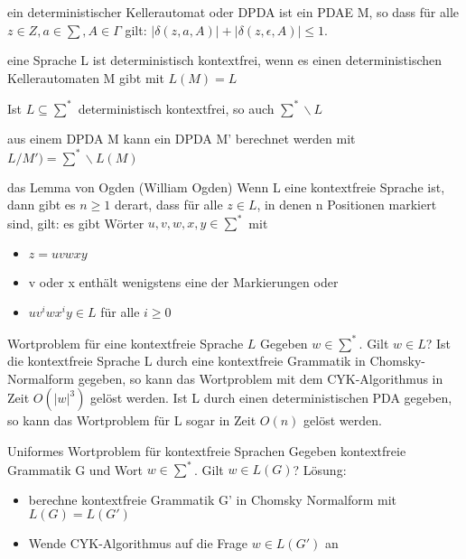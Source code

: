 \documentclass[avery5371]{flashcards}
\begin{document}
\begin{flashcard}[Definition]{ ein deterministischer Kellerautomat oder DPDA ist ein PDAE M,} so dass für alle $z\in Z, a\in\sum, A\in\Gamma$ gilt: $|\delta(z,a,A)|+|\delta(z,\epsilon,A)|\leq 1$.
\end{flashcard}

\begin{flashcard}[Definition]{ eine Sprache L ist deterministisch kontextfrei,} wenn es einen deterministischen Kellerautomaten M gibt mit $L(M)=L$
\end{flashcard}

\begin{flashcard}[Satz]{ Ist $L\subseteq \sum^*$ deterministisch kontextfrei, }so auch $\sum^*\backslash L$
\end{flashcard}

\begin{flashcard}[Satz]{} aus einem DPDA M kann ein DPDA M' berechnet werden mit $L/M')=\sum^*\backslash L(M)$
\end{flashcard}

\begin{flashcard}[Definition]{das Lemma von Ogden (William Ogden)}
Wenn L eine kontextfreie Sprache ist, dann gibt es $n\geq 1$ derart, dass für alle $z\in L$, in denen n Positionen markiert sind, gilt: es gibt Wörter $u,v,w,x,y\in\sum^*$ mit
\begin{itemize}
\item  $z=uvwxy$
\item v oder x enthält wenigstens eine der Markierungen oder
\item $uv^i wx^i y \in L$ für alle $i\geq 0$
    \end{itemize}
\end{flashcard}

\begin{flashcard}[Definition]{ Wortproblem für eine kontextfreie Sprache $L$}
     Gegeben $w\in\sum^*$. Gilt $w\in L$?
Ist die kontextfreie Sprache L durch eine kontextfreie Grammatik in Chomsky-Normalform gegeben, so kann das Wortproblem mit dem CYK-Algorithmus in Zeit $O(|w|^3)$ gelöst werden. 
Ist L durch einen deterministischen PDA gegeben, so kann das Wortproblem für L sogar in Zeit $O(n)$ gelöst werden.
\end{flashcard}

\begin{flashcard}[Definition]{ Uniformes Wortproblem für kontextfreie Sprachen} Gegeben kontextfreie Grammatik G und Wort $w\in\sum^*$. Gilt $w\in L(G)$?
Lösung:\begin{itemize}
\item berechne kontextfreie Grammatik G' in Chomsky Normalform mit $L(G)=L(G')$
\item Wende CYK-Algorithmus auf die Frage $w\in L(G')$ an
\end{itemize}
\end{flashcard}
\end{document}
